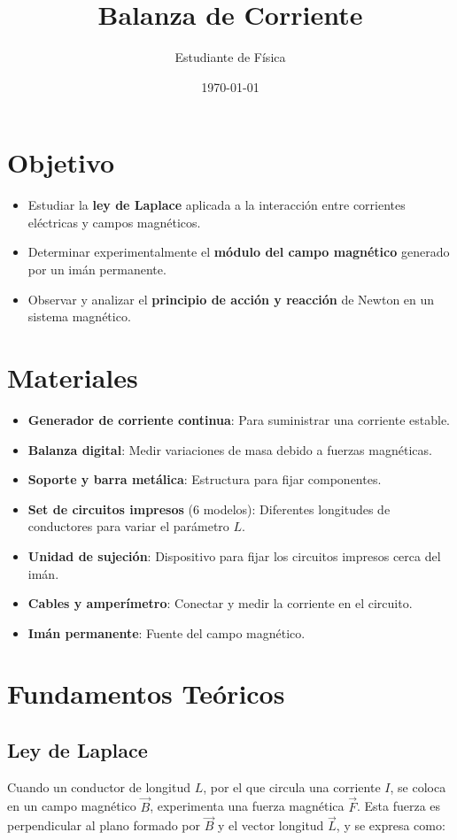 \documentclass{article}
\title{Balanza de Corriente}
\author{Estudiante de Física}
\date{\today}
\begin{document}
\maketitle

\section{Objetivo}
\begin{itemize}
    \item Estudiar la \textbf{ley de Laplace} aplicada a la interacción entre corrientes eléctricas y campos magnéticos.
    \item Determinar experimentalmente el \textbf{módulo del campo magnético} generado por un imán permanente.
    \item Observar y analizar el \textbf{principio de acción y reacción} de Newton en un sistema magnético.
\end{itemize}

\section{Materiales}
\begin{itemize}
    \item \textbf{Generador de corriente continua}: Para suministrar una corriente estable.
    \item \textbf{Balanza digital}: Medir variaciones de masa debido a fuerzas magnéticas.
    \item \textbf{Soporte y barra metálica}: Estructura para fijar componentes.
    \item \textbf{Set de circuitos impresos} (6 modelos): Diferentes longitudes de conductores para variar el parámetro \( L \).
    \item \textbf{Unidad de sujeción}: Dispositivo para fijar los circuitos impresos cerca del imán.
    \item \textbf{Cables y amperímetro}: Conectar y medir la corriente en el circuito.
    \item \textbf{Imán permanente}: Fuente del campo magnético.
\end{itemize}

\section{Fundamentos Teóricos}
\subsection{Ley de Laplace}
Cuando un conductor de longitud \( L \), por el que circula una corriente \( I \), se coloca en un campo magnético \( \vec{B} \), experimenta una fuerza magnética \( \vec{F} \). Esta fuerza es perpendicular al plano formado por \( \vec{B} \) y el vector longitud \( \vec{L} \), y se expresa como:
\end{document}
